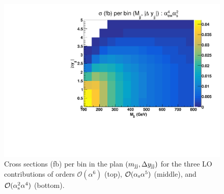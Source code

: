 \begin{figure}[ht]
\includegraphics[scale=0.395]{figures/scanfigures/scan_ew4qcd2.pdf}
\caption{Cross sections (fb) per bin in the plan $\left(m_{\text{j}\text{j}}, \Delta y_{\text{j}\text{j}}\right)$ for the three LO contributions of orders $\mathcal{O}(\alpha^6)$ (top), $\mathcal{O}(\alpha_\text{s}\alpha^5)$ (middle), and $\mathcal{O}(\alpha_\text{s}^2 \alpha^4)$ (bottom).
}
\label{fig:mjjdyjj_2d_LO}
\end{figure}
